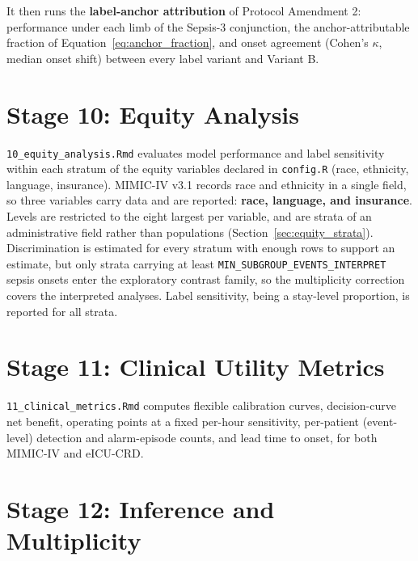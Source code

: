 It then runs the \textbf{label-anchor attribution} of Protocol Amendment 2:
performance under each limb of the Sepsis-3 conjunction, the
anchor-attributable fraction of Equation~\ref{eq:anchor_fraction}, and onset
agreement (Cohen's $\kappa$, median onset shift) between every label variant
and Variant B.


\section{Stage 10: Equity Analysis}

\texttt{10\_equity\_analysis.Rmd} evaluates model performance and label
sensitivity within each stratum of the equity variables declared in
\texttt{config.R} (race, ethnicity, language, insurance). MIMIC-IV v3.1 records
race and ethnicity in a single field, so three variables carry data and are
reported: \textbf{race, language, and insurance}. Levels are restricted to the
eight largest per variable, and are strata of an administrative field rather
than populations (Section~\ref{sec:equity_strata}). Discrimination is estimated
for every stratum with enough rows to support an estimate, but only strata
carrying at least \texttt{MIN\_\allowbreak SUBGROUP\_\allowbreak EVENTS\_\allowbreak INTERPRET} sepsis onsets enter
the exploratory contrast family, so the multiplicity correction covers the
interpreted analyses. Label sensitivity, being a stay-level proportion, is
reported for all strata.


\section{Stage 11: Clinical Utility Metrics}

\texttt{11\_clinical\_metrics.Rmd} computes flexible calibration curves,
decision-curve net benefit, operating points at a fixed per-hour sensitivity,
per-patient (event-level) detection and alarm-episode counts, and lead time
to onset, for both MIMIC-IV and eICU-CRD.


\section{Stage 12: Inference and Multiplicity}

